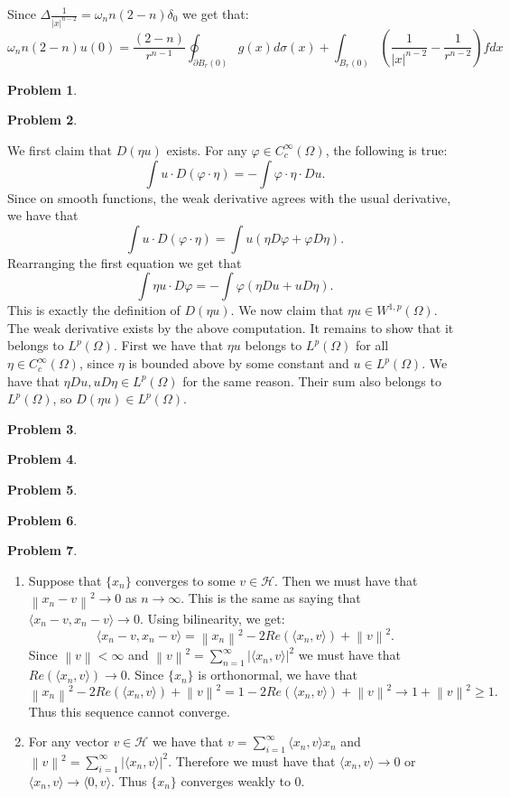 \documentclass[12pt, a4paper]{article}
\newtheorem{problem}{Problem}
\theoremstyle{definition}
\newcommand{\penum}{ \begin{enumerate}[label=\bf(\alph*), leftmargin=0pt]}
\newcommand{\epenum}{ \end{enumerate} }
\newcommand{\bd}{\partial}
\newcommand{\lan}{\langle}
\newcommand{\ran}{\rangle}
\newcommand{\norm}[1]{\left\lVert#1\right\rVert}
\newcommand{\inn}[1]{\lan#1\ran}
\begin{document}
Since $\Delta \frac{1}{|x|^{n-2}}= \omega_n n(2-n)\delta_0$ we get that:
$$\omega_n n(2-n) u(0) = \frac{(2-n)}{r^{n-1}} \oint_{\bd B_r(0)}g(x)d\sigma(x) + \int_{B_r(0)} \left( \frac{1}{|x|^{n-2}} - \frac{1}{r^{n-2}}\right) f dx  $$
\newpage
\begin{problem}
\end{problem}
\newpage
\begin{problem}
\end{problem}
We first claim that $D(\eta u)$ exists. For any $\varphi \in C_c^\infty(\Omega)$, the following is true: 
$$\int u \cdot D(\varphi \cdot \eta) = - \int \varphi \cdot \eta \cdot Du.$$
Since on smooth functions, the weak derivative agrees with the usual derivative, we have that $$\int u \cdot D(\varphi \cdot \eta) = \int u \left(\eta D\varphi + \varphi D \eta\right).$$
Rearranging the first equation we get that 
$$\int \eta u \cdot D\varphi = - \int\varphi \left( \eta Du + u D \eta \right).$$
This is exactly the definition of $D(\eta u)$. We now claim that $\eta u \in W^{1,p}(\Omega)$.
The weak derivative exists by the above computation. It remains to show that it belongs to $L^p(\Omega)$. First we have that $\eta u$ belongs to $L^p(\Omega)$ for all $\eta \in C_c^\infty(\Omega)$, since $\eta$ is bounded above by some constant and $u\in L^p(\Omega)$. We have that $\eta Du, u D\eta\in L^p(\Omega)$ for the same reason. Their sum also belongs to $L^p(\Omega)$, so $D(\eta u)\in L^p(\Omega)$. 
\newpage
\begin{problem}
\end{problem}
\newpage
\begin{problem}
\end{problem}
\newpage
\begin{problem}
\end{problem}
\newpage
\begin{problem}
\end{problem}
\newpage
\begin{problem}
\end{problem}
\penum
\item 
Suppose that $\{x_n\}$ converges to some $v \in \mathcal{H}$. Then we must have that $\norm{x_n - v}^2\to 0$ as $n \to \infty$. This is the same as saying that $\inn{x_n - v, x_n-v} \to 0$. Using bilinearity, we get:
$$\inn{x_n - v, x_n-v}  = \norm{x_n}^2 - 2 Re(\inn{x_n,v}) + \norm{v}^2. $$ Since $\norm{v} <\infty$ and $\norm{v}^2 = \sum_{n=1}^\infty |\inn{x_n,v}|^2$ we must have that $Re(\inn{x_n,v}) \to 0$. Since $\{x_n\}$ is orthonormal, we have that 
$$\norm{x_n}^2 - 2Re(\inn{x_n,v}) + \norm{v}^2 = 1 - 2 Re(\inn{x_n,v}) + \norm{v}^2 \to 1 + \norm{v}^2 \geq 1.$$
Thus this sequence cannot converge. 
\item For any vector $v\in \mathcal{H}$ we have that $v = \sum_{i=1}^\infty \inn{x_n,v}x_n$ and $\norm{v}^2 = \sum_{i=1}^\infty |\inn{x_n,v}|^2$. Therefore we must have that $\inn{x_n,v} \to 0$ or $\inn{x_n,v} \to \inn{0,v}$. Thus $\{x_n\}$ converges weakly to $0$. 

\epenum
\end{document}
